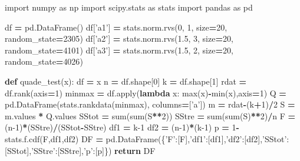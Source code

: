 \documentclass[polish,]{book}
\newenvironment{Shaded}{\begin{snugshade}}{\end{snugshade}}
\newcommand{\BuiltInTok}[1]{#1}
\newcommand{\ControlFlowTok}[1]{\textcolor[rgb]{0.13,0.29,0.53}{\textbf{#1}}}
\newcommand{\DecValTok}[1]{\textcolor[rgb]{0.00,0.00,0.81}{#1}}
\newcommand{\FloatTok}[1]{\textcolor[rgb]{0.00,0.00,0.81}{#1}}
\newcommand{\ImportTok}[1]{#1}
\newcommand{\KeywordTok}[1]{\textcolor[rgb]{0.13,0.29,0.53}{\textbf{#1}}}
\newcommand{\NormalTok}[1]{#1}
\newcommand{\OperatorTok}[1]{\textcolor[rgb]{0.81,0.36,0.00}{\textbf{#1}}}
\newcommand{\StringTok}[1]{\textcolor[rgb]{0.31,0.60,0.02}{#1}}
\begin{document}
\begin{Shaded}
\begin{Highlighting}[]
\ImportTok{import}\NormalTok{ numpy }\ImportTok{as}\NormalTok{ np}
\ImportTok{import}\NormalTok{ scipy.stats }\ImportTok{as}\NormalTok{ stats}
\ImportTok{import}\NormalTok{ pandas }\ImportTok{as}\NormalTok{ pd}

\NormalTok{df }\OperatorTok{=}\NormalTok{ pd.DataFrame()}
\NormalTok{df[}\StringTok{'a1'}\NormalTok{] }\OperatorTok{=}\NormalTok{ stats.norm.rvs(}\DecValTok{0}\NormalTok{, }\DecValTok{1}\NormalTok{, size}\OperatorTok{=}\DecValTok{20}\NormalTok{, random_state}\OperatorTok{=}\DecValTok{2305}\NormalTok{)}
\NormalTok{df[}\StringTok{'a2'}\NormalTok{] }\OperatorTok{=}\NormalTok{ stats.norm.rvs(}\FloatTok{1.5}\NormalTok{, }\DecValTok{3}\NormalTok{, size}\OperatorTok{=}\DecValTok{20}\NormalTok{, random_state}\OperatorTok{=}\DecValTok{4101}\NormalTok{)}
\NormalTok{df[}\StringTok{'a3'}\NormalTok{] }\OperatorTok{=}\NormalTok{ stats.norm.rvs(}\FloatTok{1.5}\NormalTok{, }\DecValTok{2}\NormalTok{, size}\OperatorTok{=}\DecValTok{20}\NormalTok{, random_state}\OperatorTok{=}\DecValTok{4026}\NormalTok{)}

\KeywordTok{def}\NormalTok{ quade_test(x):}
\NormalTok{    df }\OperatorTok{=}\NormalTok{ x}
\NormalTok{    n }\OperatorTok{=}\NormalTok{ df.shape[}\DecValTok{0}\NormalTok{]}
\NormalTok{    k }\OperatorTok{=}\NormalTok{ df.shape[}\DecValTok{1}\NormalTok{]}
\NormalTok{    rdat }\OperatorTok{=}\NormalTok{ df.rank(axis}\OperatorTok{=}\DecValTok{1}\NormalTok{)}
\NormalTok{    minmax }\OperatorTok{=}\NormalTok{ df.}\BuiltInTok{apply}\NormalTok{(}\KeywordTok{lambda}\NormalTok{ x: }\BuiltInTok{max}\NormalTok{(x)}\OperatorTok{-}\BuiltInTok{min}\NormalTok{(x),axis}\OperatorTok{=}\DecValTok{1}\NormalTok{)}
\NormalTok{    Q }\OperatorTok{=}\NormalTok{ pd.DataFrame(stats.rankdata(minmax), columns}\OperatorTok{=}\NormalTok{[}\StringTok{'a'}\NormalTok{])}
\NormalTok{    m }\OperatorTok{=}\NormalTok{ rdat}\OperatorTok{-}\NormalTok{(k}\OperatorTok{+}\DecValTok{1}\NormalTok{)}\OperatorTok{/}\DecValTok{2}
\NormalTok{    S }\OperatorTok{=}\NormalTok{ m.values }\OperatorTok{*}\NormalTok{ Q.values}
\NormalTok{    SStot }\OperatorTok{=} \BuiltInTok{sum}\NormalTok{(}\BuiltInTok{sum}\NormalTok{(S}\OperatorTok{**}\DecValTok{2}\NormalTok{))}
\NormalTok{    SStre }\OperatorTok{=} \BuiltInTok{sum}\NormalTok{(}\BuiltInTok{sum}\NormalTok{(S)}\OperatorTok{**}\DecValTok{2}\NormalTok{)}\OperatorTok{/}\NormalTok{n}
\NormalTok{    F }\OperatorTok{=}\NormalTok{ (n}\DecValTok{-1}\NormalTok{)}\OperatorTok{*}\NormalTok{(SStre)}\OperatorTok{/}\NormalTok{(SStot}\OperatorTok{-}\NormalTok{SStre)}
\NormalTok{    df1 }\OperatorTok{=}\NormalTok{ k}\DecValTok{-1}
\NormalTok{    df2 }\OperatorTok{=}\NormalTok{ (n}\DecValTok{-1}\NormalTok{)}\OperatorTok{*}\NormalTok{(k}\DecValTok{-1}\NormalTok{)}
\NormalTok{    p }\OperatorTok{=} \DecValTok{1}\OperatorTok{-}\NormalTok{stats.f.cdf(F,df1,df2)}
\NormalTok{    DF }\OperatorTok{=}\NormalTok{ pd.DataFrame(\{}\StringTok{'F'}\NormalTok{:[F],}\StringTok{'df1'}\NormalTok{:[df1],}\StringTok{'df2'}\NormalTok{:[df2],}\StringTok{'SStot'}\NormalTok{:[SStot],}\StringTok{'SStre'}\NormalTok{:[SStre],}\StringTok{'p'}\NormalTok{:[p]\})}
    \ControlFlowTok{return}\NormalTok{ DF}
    

\end{Highlighting}
\end{Shaded}
\end{document}
